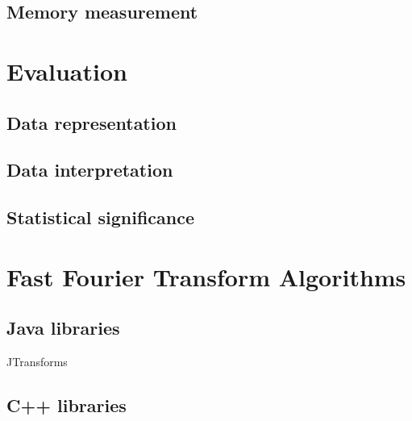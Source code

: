 \subsection{Memory measurement}

\section{Evaluation}

\subsection{Data representation}
\subsection{Data interpretation}
\subsection{Statistical significance}


\section{Fast Fourier Transform Algorithms}

\subsection{Java libraries}
JTransforms\cite{jtransforms:benchmark}

\subsection{C++ libraries}
\cite{FFTW05}

